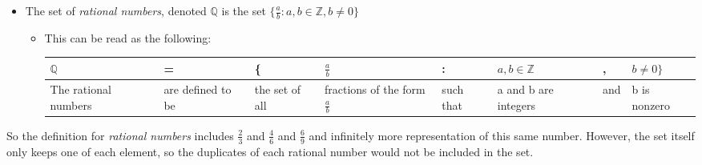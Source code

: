 \documentclass{report}
\begin{document}
\begin{itemize}
  \item The set of \emph{rational numbers}, denoted $\mathbb{Q}$ is the set $\{\frac{a}{b}: a,b \in \mathbb{Z}, b \neq 0 \}$
  \begin{itemize}
    \item This can be read as the following:
          \begin{center}
          \begin{tabularx}{0.95\textwidth}{ %
            | >{\centering\arraybackslash}X %
            | >{\centering\arraybackslash}X
            | >{\centering\arraybackslash}X
            | >{\centering\arraybackslash}X
            | >{\centering\arraybackslash}X
            | >{\centering\arraybackslash}X
            | >{\centering\arraybackslash}X
            | >{\centering\arraybackslash}X | }
            $\mathbb{Q}$ & = & \{ & $\frac{a}{b}$ & : & $a,b \in \mathbb{Z}$ & , & $b \neq 0\}$ \\
            \hline
            The rational numbers & are defined to be & the set of all & fractions of the form $\frac{a}{b}$ & such that & a and b are integers & and & b is nonzero \\
          \end{tabularx}
          \end{center}
  \end{itemize}
\end{itemize}


So the definition for \emph{rational numbers} includes $\frac{2}{3}$ and $\frac{4}{6}$ and $\frac{6}{9}$ and infinitely more representation of this same number. However, the set itself only keeps one of each element, so the duplicates of each rational number would not be included in the set.
\end{document}
